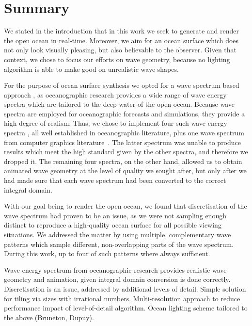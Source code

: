 \chapter{Summary}
\label{ch:summary}

We stated in the introduction that in this work we seek to generate and render the
open ocean in real-time. Moreover, we aim for an ocean surface which does not only
look visually pleasing, but also believable to the observer. Given that context,
we chose to focus our efforts on wave geometry, because no lighting algorithm
is able to make good on unrealistic wave shapes.

For the purpose of ocean surface synthesis we opted for a wave spectrum
based approach \citep{course:simulatingocean}, as oceanographic research
provides a wide range of wave energy spectra which are tailored to the
deep water of the open ocean.
Because wave spectra are employed for oceanographic forecasts and
simulations, they provide a high degree of realism.
Thus, we chose to implement four such wave energy spectra
\citep{article:PiersonMoskowitz1964, article:Hasselman1973, article:Donelan1985, article:Elfouhaily1997},
all well established in oceanographic literature, plus one wave
spectrum from computer graphics literature~\citep{course:simulatingocean}.
The latter spectrum was unable to produce results which meet the high
standard given by the other spectra, and therefore we dropped it.
The remaining four spectra, on the other hand, allowed us to obtain
animated wave geometry at the level of quality we sought after,
but only after we had made sure that each wave spectrum had been converted
to the correct integral domain.
%

With our goal being to render the open ocean, we found that discretisation
of the wave spectrum had proven to be an issue, as we were not sampling enough
distinct \wavenumbers to reproduce a high-quality ocean surface for all
possible viewing situations. We addressed the matter by using multiple,
complementary wave patterns which sample different, non-overlapping parts
of the wave spectrum. During this work, up to four of such patterns where
always sufficient.


Wave energy spectrum from oceanographic research provides realistic wave geometry
and animation, given integral domain conversion is done correctly.
Discretisation is an issue, addressed by additional levels of detail.
Simple solution for tiling via sizes with irrational numbers.
Multi-resolution approach to reduce performance impact of level-of-detail
algorithm.
Ocean lighting scheme tailored to the above (Bruneton, Dupuy).

